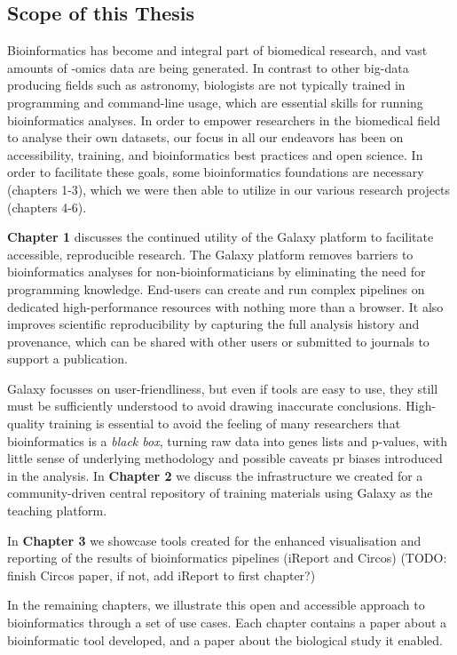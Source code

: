 \begin{justify}
\section{Scope of this Thesis}

Bioinformatics has become and integral part of biomedical research, and vast amounts of -omics data are being generated. In contrast to other big-data producing fields such as astronomy, biologists are not typically trained in programming and command-line usage, which are essential skills for running bioinformatics analyses. In order to empower researchers in the biomedical field to analyse their own datasets, our focus in all our endeavors has been on accessibility, training, and bioinformatics best practices and open science. In order to facilitate these goals, some bioinformatics foundations are necessary (chapters 1-3), which we were then able to utilize in our various research projects (chapters 4-6).

\textbf{Chapter 1} discusses the continued utility of the Galaxy platform to facilitate accessible, reproducible research. The Galaxy platform removes barriers to bioinformatics analyses for non-bioinformaticians by eliminating the need for programming knowledge. End-users can create and run complex pipelines on dedicated high-performance resources with nothing more than a browser. It also improves scientific reproducibility by capturing the full analysis history and provenance, which can be shared with other users or submitted to journals to support a publication.

Galaxy focusses on user-friendliness, but even if tools are easy to use, they still must be sufficiently understood to avoid drawing inaccurate conclusions. High-quality training is essential to avoid the feeling of many researchers that bioinformatics is a \emph{black box}, turning raw data into genes lists and p-values, with little sense of underlying methodology and possible caveats pr biases introduced in the analysis. In \textbf{Chapter 2} we discuss the infrastructure we created for a community-driven central repository of training materials using Galaxy as the teaching platform.

In \textbf{Chapter 3} we showcase tools created for the enhanced visualisation and reporting of the results of bioinformatics pipelines (iReport and Circos) (TODO: finish Circos paper, if not, add iReport to first chapter?)

In the remaining chapters, we illustrate this open and accessible approach to bioinformatics through a set of use cases. Each chapter contains a paper about a bioinformatic tool developed, and a paper about the biological study it enabled.


\end{justify}
